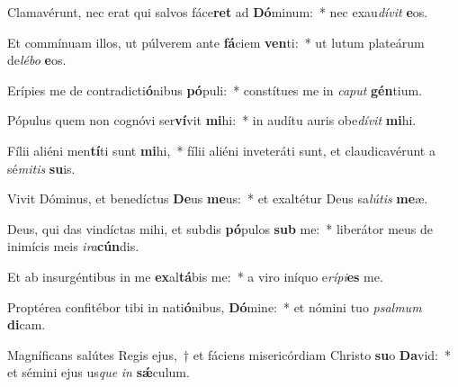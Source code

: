 \item Clamavérunt, nec erat qui salvos fáce\textbf{ret} ad \textbf{Dó}minum:~* nec exau\textit{dí}\textit{vit} \textbf{e}os.
\item Et commínuam illos, ut púlverem ante \textbf{fá}ciem \textbf{ven}ti:~* ut lutum plateárum de\textit{lé}\textit{bo} \textbf{e}os.
\item Erípies me de contradicti\textbf{ó}nibus \textbf{pó}puli:~* constítues me in \textit{ca}\textit{put} \textbf{gén}tium.
\item Pópulus quem non cognóvi ser\textbf{ví}vit \textbf{mi}hi:~* in audítu auris obe\textit{dí}\textit{vit} \textbf{mi}hi.
\item Fílii aliéni men\textbf{tí}ti sunt \textbf{mi}hi,~* fílii aliéni inveteráti sunt, et claudicavérunt a sé\textit{mi}\textit{tis} \textbf{su}is.
\item Vivit Dóminus, et benedíctus \textbf{De}us \textbf{me}us:~* et exaltétur Deus sa\textit{lú}\textit{tis} \textbf{me}æ.
\item Deus, qui das vindíctas mihi, et subdis \textbf{pó}pulos \textbf{sub} me:~* liberátor meus de inimícis meis \textit{i}\textit{ra}\textbf{cún}dis.
\item Et ab insurgéntibus in me \textbf{ex}al\textbf{tá}bis me:~* a viro iníquo e\textit{rí}\textit{pi}\textbf{es} me.
\item Proptérea confitébor tibi in nati\textbf{ó}nibus, \textbf{Dó}mine:~* et nómini tuo \textit{psal}\textit{mum} \textbf{di}cam.
\item Magníficans salútes Regis ejus,~† et fáciens misericórdiam Christo \textbf{su}o \textbf{Da}vid:~* et sémini ejus us\textit{que} \textit{in} \textbf{sǽ}culum.
